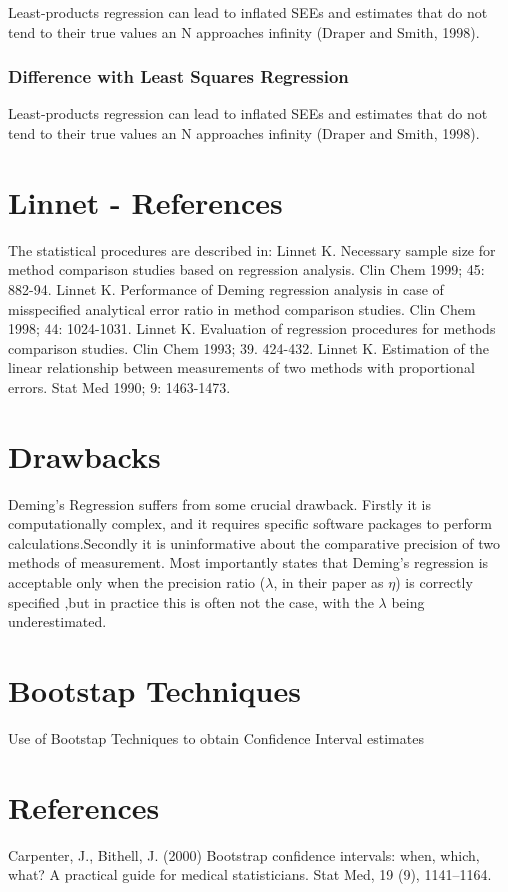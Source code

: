 \documentclass[12pt, a4paper]{report}
\theoremstyle{plain}
\theoremstyle{definition}
\theoremstyle{remark}
\begin{document}
Least-products regression can lead to inflated SEEs and estimates that do not tend to their true values an N approaches infinity (Draper and Smith, 1998).
\subsubsection{Difference with Least Squares Regression}
Least-products regression can lead to inflated SEEs and estimates
that do not tend to their true values an N approaches infinity
(Draper and Smith, 1998).




\section{Linnet - References}
The statistical procedures are described in:
Linnet K. Necessary sample size for method comparison studies based on regression analysis. Clin Chem 1999; 45: 882-94.
Linnet K. Performance of Deming regression analysis in case of misspecified analytical error ratio in method comparison studies. Clin Chem 1998; 44: 1024-1031.
Linnet K. Evaluation of regression procedures for methods comparison studies. Clin Chem 1993; 39. 424-432.
Linnet K. Estimation of the linear relationship between measurements of two methods with proportional errors. Stat Med 1990; 9: 1463-1473.

\section{Drawbacks}
Deming's Regression suffers from some crucial drawback. Firstly it
is computationally complex, and it requires specific software
packages to perform calculations.Secondly it is uninformative
about the comparative precision of two methods of measurement.
Most importantly \citet{CarollRupert} states that Deming's
regression is acceptable only when the precision ratio ($\lambda$,
in their paper as $\eta$) is correctly specified ,but in practice
this is often not the case, with the $\lambda$ being
underestimated.	


\section{Bootstap Techniques}
Use of Bootstap Techniques to obtain Confidence Interval estimates

\section{References}
Carpenter, J., Bithell, J. (2000) Bootstrap conﬁdence intervals: when, which, what? A practical
guide for medical statisticians. Stat Med, 19 (9), 1141–1164.
\end{document}
